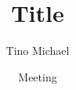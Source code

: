 \documentclass[8pt]{beamer}
\title[short Title]{Title}
\subtitle{}
\author[Tino Michael]{Tino Michael\vspace{-12pt}}
\institute[CEA Saclay]{CEA Saclay, Irfu/SAp}
\date[\mydate]{Meeting\\\mydate}
\newif\ifnobackup
\begin{document}
    \begin{frame}
        \titlepage
    \end{frame}


    \ifnobackup
        
\end{document}
